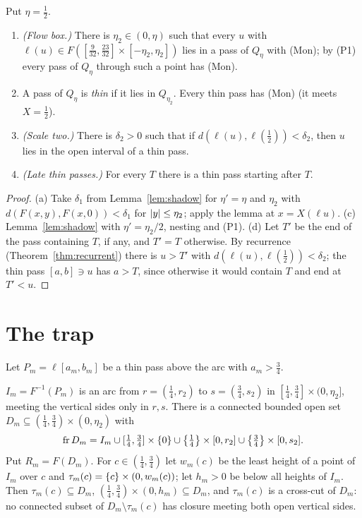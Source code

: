 \begin{corollary}\label{cor:scales}
Put $\eta=\frac12$.
\begin{enumerate}[label=(\alph*)]
\item \emph{(Flow box.)} There is $\eta_2\in(0,\eta)$ such that every $u$ with $\ell(u)\in F([\frac9{32},\frac{23}{32}]\times[-\eta_2,\eta_2])$ lies in a pass of
$Q_\eta$ with (Mon); by (P1) every pass of $Q_\eta$ through such a point has (Mon).
\item A pass of $Q_\eta$ is \emph{thin} if it lies in $Q_{\eta_2}$. Every thin pass has (Mon) (it meets $X=\frac12$).
\item \emph{(Scale two.)} There is $\delta_2>0$ such that if $d(\ell(u),\ell(\frac12))<\delta_2$, then $u$ lies in the open interval of a thin pass.
\item \emph{(Late thin passes.)} For every $T$ there is a thin pass starting after $T$.
\end{enumerate}
\end{corollary}

\begin{proof}
(a) Take $\delta_1$ from Lemma~\ref{lem:shadow} for $\eta'=\eta$ and $\eta_2$ with $d(F(x,y),F(x,0))<\delta_1$ for $\left\lvert y\right\rvert\le\eta_2$; apply the lemma at
$x=X(\ell u)$. (c) Lemma~\ref{lem:shadow} with $\eta'=\eta_2/2$, nesting and (P1). (d) Let $T'$ be the end of the pass containing $T$, if any,
and $T'=T$ otherwise. By recurrence (Theorem~\ref{thm:recurrent}) there is $u>T'$ with $d(\ell(u),\ell(\frac12))<\delta_2$; the thin pass $[a,b]\ni u$
has $a>T$, since otherwise it would contain $T$ and end at $T'<u$.
\end{proof}


\section{The trap}\label{sec:trap}

Let $P_m=\ell[a_m,b_m]$ be a thin pass above the arc with $a_m>\frac34$.

\begin{lemma}\label{lem:region}
$I_m=F^{-1}(P_m)$ is an arc from $r=(\frac14,r_2)$ to $s=(\frac34,s_2)$ in $[\frac14,\frac34]\times(0,\eta_2]$, meeting the vertical sides only in $r,s$.
There is a connected bounded open set $D_m\subseteq(\frac14,\frac34)\times(0,\eta_2)$ with
\[
\operatorname{fr} D_m=I_m\cup[\tfrac14,\tfrac34]\times\left\{ 0 \right\}\cup\left\{ \tfrac14 \right\}\times[0,r_2]\cup\left\{ \tfrac34 \right\}\times[0,s_2].
\]
Put $R_m=F(D_m)$. For $c\in(\frac14,\frac34)$ let $w_m(c)$ be the least height of a point of $I_m$ over $c$ and $\tau_m(c)=\left\{ c \right\}\times(0,w_m(c))$; let
$h_m>0$ be below all heights of $I_m$. Then $\tau_m(c)\subseteq D_m$, $(\frac14,\frac34)\times(0,h_m)\subseteq D_m$, and $\tau_m(c)$ is a cross-cut of $D_m$: no
connected subset of $D_m\setminus\tau_m(c)$ has closure meeting both open vertical sides.
\end{lemma}


